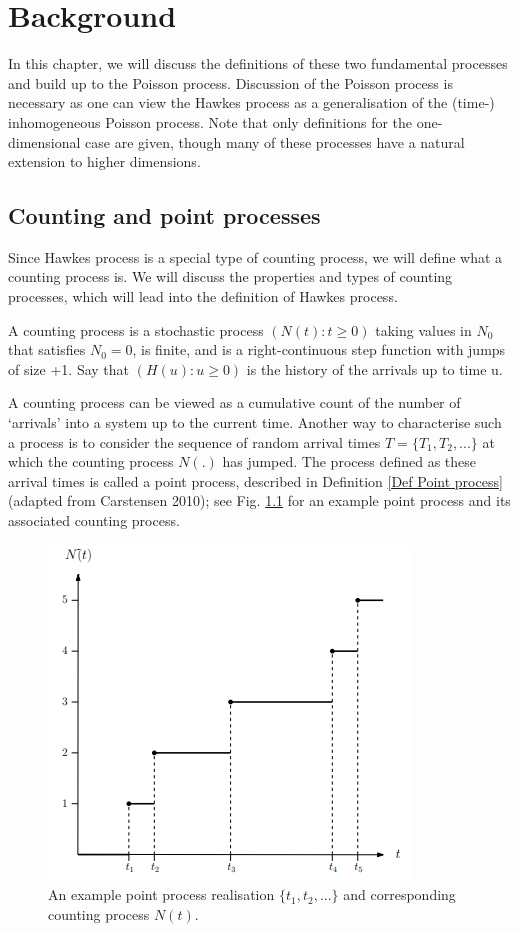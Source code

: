 \chapter{Background}
In this chapter, we will discuss the definitions
of these two fundamental processes and  build up to the Poisson process. Discussion of the Poisson process is necessary as one can view the Hawkes process as a generalisation of the (time-) inhomogeneous Poisson process. Note that only definitions for
the one-dimensional case are given, though many of these processes have a natural extension to higher dimensions.
\section{Counting and point processes}
Since Hawkes process is a special type of counting process, we will define what a counting process is. We will discuss the properties and types of counting processes, which will lead into the definition of Hawkes process.

\begin{Definition}
	A counting process is a stochastic process $(N(t):t \geq 0)$ taking values in
	$N_{0}$ that satisfies $N_{0} = 0$, is finite, and is a right-continuous step function
	with jumps of size +1. Say that $(H(u) : u \geq 0)$ is the history of the arrivals
	up to time u.
\end{Definition}

A counting process can be viewed as a cumulative count of the number of ‘arrivals’ into a system up to the current time. Another way to characterise such a
process is to consider the sequence of random arrival times $T = \{T_{1}, T_{2}, . . .\}$ at which
the counting process $N(.)$ has jumped. The process defined as these arrival times is
called a point process, described in Definition \ref{Def Point process} (adapted from Carstensen 2010); see Fig. \ref{PointAndCountingProcess} for an example point process and its associated counting process.

  \begin{figure}[H]
  	\centering
  	\includegraphics{PointProcessAndCountingProcess.PNG}
  	\caption{An example point process realisation $\{t_{1}, t_{2}, . . . \}$ and corresponding counting process $N(t)$.}
  	\label{PointAndCountingProcess}
  \end{figure}


